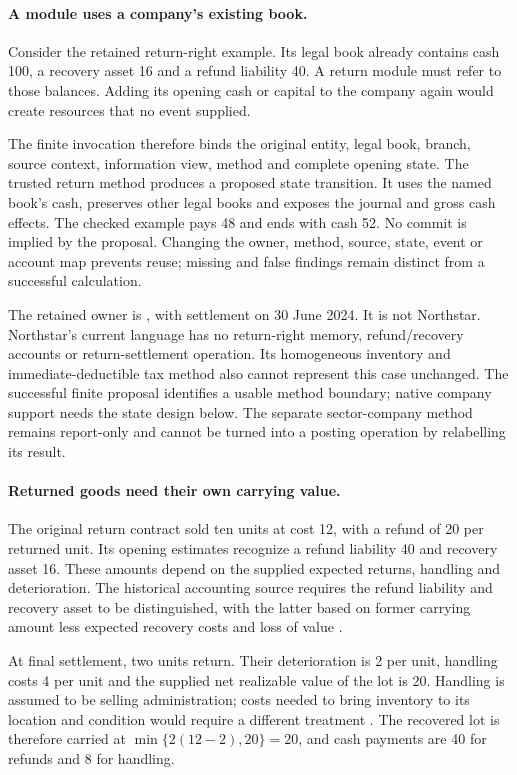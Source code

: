 \paragraph{A module uses a company's existing book.}
Consider the retained return-right example. Its legal book already contains
cash 100, a recovery asset 16 and a refund liability 40. A return module must
refer to those balances. Adding its opening cash or capital to the company
again would create resources that no event supplied.

The finite invocation therefore binds the original entity, legal book,
branch, source context, information view, method and complete opening state.
The trusted return method produces a proposed state transition. It uses the
named book's cash, preserves other legal books and exposes the journal and
gross cash effects. The checked example pays 48 and ends with cash 52. No
commit is implied by the proposal. Changing the owner, method, source, state,
event or account map prevents reuse; missing and false findings remain
distinct from a successful calculation.

The retained owner is , with settlement on
30 June 2024. It is not Northstar. Northstar's current language has no
return-right memory, refund/recovery accounts or return-settlement operation.
Its homogeneous inventory and immediate-deductible tax method also cannot
represent this case unchanged. The successful finite proposal identifies a
usable method boundary; native company support needs the state design below.
The separate sector-company method remains report-only and cannot be turned
into a posting operation by relabelling its result.

\paragraph{Returned goods need their own carrying value.}
The original return contract sold ten units at cost 12, with a refund of 20
per returned unit. Its opening estimates recognize a refund liability 40 and
recovery asset 16. These amounts depend on the supplied expected returns,
handling and deterioration. The historical accounting source requires the
refund liability and recovery asset to be distinguished, with the latter
based on former carrying amount less expected recovery costs and loss of
value \citep[IFRS~15.B21--B27]{eu20231803}.

At final settlement, two units return. Their deterioration is 2 per unit,
handling costs 4 per unit and the supplied net realizable value of the lot is
20. Handling is assumed to be selling administration; costs needed to bring
inventory to its location and condition would require a different treatment
\citep[IAS~2.15--16]{eu20231803}. The recovered lot is therefore carried at
$\min\{2(12-2),20\}=20$, and cash payments are 40 for refunds and 8 for handling.

